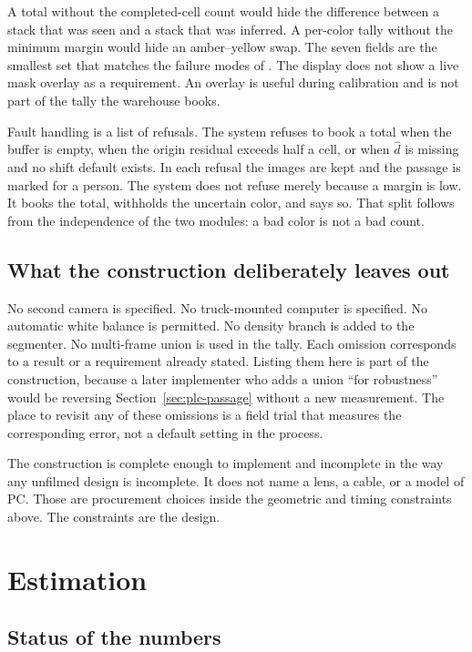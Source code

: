 A total without the completed-cell count would hide the difference between a stack that was seen and a stack that was inferred. A per-color tally without the minimum margin would hide an amber--yellow swap. The seven fields are the smallest set that matches the failure modes of . The display does not show a live mask overlay as a requirement. An overlay is useful during calibration and is not part of the tally the warehouse books.

Fault handling is a list of refusals. The system refuses to book a total when the buffer is empty, when the origin residual exceeds half a cell, or when $\hat{d}$ is missing and no shift default exists. In each refusal the images are kept and the passage is marked for a person. The system does not refuse merely because a margin is low. It books the total, withholds the uncertain color, and says so. That split follows from the independence of the two modules: a bad color is not a bad count.

\subsection{What the construction deliberately leaves out}
\label{sec:leave-out}

No second camera is specified. No truck-mounted computer is specified. No automatic white balance is permitted. No density branch is added to the segmenter. No multi-frame union is used in the tally. Each omission corresponds to a result or a requirement already stated. Listing them here is part of the construction, because a later implementer who adds a union ``for robustness'' would be reversing Section~\ref{sec:plc-passage} without a new measurement. The place to revisit any of these omissions is a field trial that measures the corresponding error, not a default setting in the process.

The construction is complete enough to implement and incomplete in the way any unfilmed design is incomplete. It does not name a lens, a cable, or a model of PC. Those are procurement choices inside the geometric and timing constraints above. The constraints are the design.

\section{Estimation}
\label{sec:estimate}

\subsection{Status of the numbers}
\label{sec:status}

